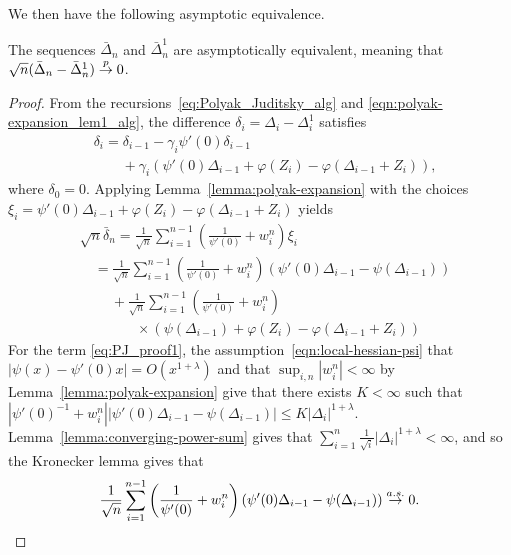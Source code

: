 We then have the following asymptotic equivalence.
\begin{lemma}
  The sequences $\bar{\Delta}_n$ and $\bar{\Delta}^1_n$ are asymptotically
  equivalent, meaning that
  $\sqrt{n} (\bar{\Delta}_n - \bar{\Delta}_n^1) \stackrel{p}{\rightarrow} 0$.
\end{lemma}
\begin{proof}
  From the recursions~\eqref{eq:Polyak_Juditsky_alg} and
  \eqref{eqn:polyak-expansion_lem1_alg}, the difference $\delta_i = \Delta_i
  - \Delta_i^1$ satisfies
  \begin{align*}
  & \delta_i = \delta_{i-1} - \gamma_i \psi'(0) \delta_{i-1}  \\
  & \qquad + \gamma_i \left( \psi'(0) \Delta_{i-1}  + \varphi(Z_i) - \varphi(\Delta_{i-1} + Z_i) \right),
  \end{align*}
  where $\delta_0 = 0$. Applying Lemma~\ref{lemma:polyak-expansion} with the
  choices $\xi_i = \psi'(0) \Delta_{i-1} + \varphi(Z_i) -
  \varphi(\Delta_{i-1} + Z_i)$ yields
  \begin{align}
    & \sqrt{n}\bar{\delta}_n
    = \frac{1}{\sqrt{n}} \sum_{i=1}^{n-1}
    \left( \frac{1}{\psi'(0)} + w_i^n \right)  \xi_i  \nonumber \\
    & \quad = \frac{1}{\sqrt{n}} \sum_{i=1}^{n-1}
    \left( \frac{1}{\psi'(0)} + w_i^n \right)
    \left( \psi'(0) \Delta_{i-1}  - \psi(\Delta_{i-1}) \right)
    \label{eq:PJ_proof1} \\
    & \qquad ~ + 
    \frac{1}{\sqrt{n}} \sum_{i=1}^{n-1} \left( \frac{1}{\psi'(0)}
    + w_i^n \right) \label{eq:PJ_proof2} \\
    & \qquad \qquad \times 
    \left( \psi(\Delta_{i-1})  + \varphi(Z_i) - \varphi(\Delta_{i-1}+Z_i)
    \right) \nonumber 
  \end{align}
  For the term \eqref{eq:PJ_proof1},
  the assumption~\eqref{eqn:local-hessian-psi} that
  $|\psi(x) - \psi'(0) x| = O(x^{1 + \lambda})$
  and that $\sup_{i,n} |w_i^n| < \infty$ by Lemma~\ref{lemma:polyak-expansion}
  give that there exists $K < \infty$ such that
  $|\psi'(0)^{-1} + w_i^n| |\psi'(0) \Delta_{i-1} - \psi(\Delta_{i-1})|
  \le K |\Delta_i|^{1 + \lambda}$.
  Lemma~\ref{lemma:converging-power-sum} gives that
  $\sum_{i = 1}^n
  \frac{1}{\sqrt{i}} |\Delta_i|^{1 + \lambda} < \infty$,
  and so the Kronecker lemma gives that
  \begin{equation*}
    \frac{1}{\sqrt{n}} \sum_{i=1}^{n-1} \left( \frac{1}{\psi'(0)}  + w_i^n \right)  \left( \psi'(0) \Delta_{i-1}  - \psi(\Delta_{i-1}) \right) \stackrel{a.s.}{\rightarrow} 0.
  \end{equation*}


\end{proof}
